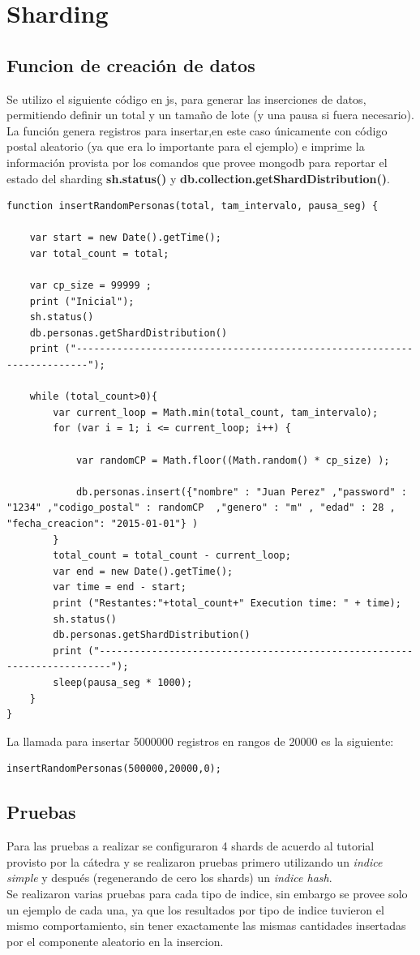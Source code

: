 \section{Sharding}


\subsection{Funcion de creación de datos}
Se utilizo el siguiente código en js, para generar las inserciones de datos, permitiendo definir un total y un tamaño de lote (y una pausa si fuera necesario). La función genera registros para insertar,en este caso únicamente con código postal aleatorio (ya que era lo importante para el ejemplo) e imprime la información provista por los comandos que provee mongodb para reportar el estado del sharding 	\textbf{sh.status()} y \textbf{db.collection.getShardDistribution()}.

\begin{lstlisting}
function insertRandomPersonas(total, tam_intervalo, pausa_seg) {

	var start = new Date().getTime();
	var total_count = total;
	
	var cp_size = 99999 ;
	print ("Inicial");
	sh.status()
	db.personas.getShardDistribution()
	print ("------------------------------------------------------------------------");
	
	while (total_count>0){
		var current_loop = Math.min(total_count, tam_intervalo);
		for (var i = 1; i <= current_loop; i++) {
			
			var randomCP = Math.floor((Math.random() * cp_size) );
		
			db.personas.insert({"nombre" : "Juan Perez" ,"password" : "1234" ,"codigo_postal" : randomCP  ,"genero" : "m" ,	"edad" : 28 ,	"fecha_creacion": "2015-01-01"} )
		}
		total_count = total_count - current_loop;
		var end = new Date().getTime();
		var time = end - start;
		print ("Restantes:"+total_count+" Execution time: " + time);
		sh.status()
		db.personas.getShardDistribution()
		print ("------------------------------------------------------------------------");
		sleep(pausa_seg * 1000);
	}
}
\end{lstlisting}

La llamada para insertar 5000000 registros en rangos de 20000 es la siguiente: 
\begin{lstlisting}
insertRandomPersonas(500000,20000,0);
\end{lstlisting}

\subsection{Pruebas}
Para las pruebas a realizar se configuraron 4 shards de acuerdo al tutorial provisto por la cátedra y se realizaron pruebas primero utilizando un \textit{indice simple} y después (regenerando de cero los shards) un \textit{indice hash}.\\
Se realizaron varias pruebas para cada tipo de indice, sin embargo se provee solo un ejemplo de cada una, ya que los resultados por tipo de indice tuvieron el mismo comportamiento, sin tener exactamente las mismas cantidades insertadas por el componente aleatorio en la insercion. 

